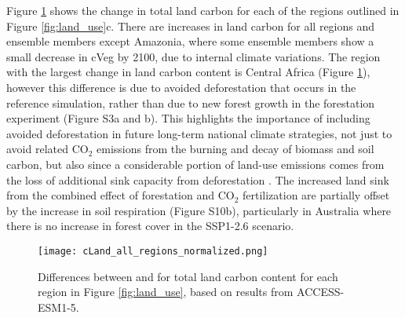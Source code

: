 \documentclass[draft]{agujournal2019}
\begin{document}
Figure \ref{fig:accesss_regional_cland} shows the change in total land carbon for each of the regions outlined in Figure \ref{fig:land_use}c.
There are increases in land carbon for all regions and ensemble members except Amazonia, where some ensemble members show a small decrease in cVeg by 2100, due to internal climate variations.
The region with the largest change in land carbon content is Central Africa (Figure \ref{fig:accesss_regional_cland}), however this difference is due to avoided deforestation that occurs in the reference simulation, rather than due to new forest growth in the forestation experiment (Figure S3a and b).
This highlights the importance of including avoided deforestation in future long-term national climate strategies, not just to avoid related CO$_2$ emissions from the burning and decay of biomass and soil carbon, but also since a considerable portion of land-use emissions comes from the loss of additional sink capacity from deforestation \cite{gitz_amplifying_2003, pongratz_terminology_2014, obermeier_modelled_2021}.
The increased land sink from the combined effect of forestation and CO$_2$ fertilization are partially offset by the increase in soil respiration (Figure S10b), particularly in Australia where there is no increase in forest cover in the SSP1-2.6 scenario.

\begin{figure}
    \texttt{[image: cLand\_all\_regions\_normalized.png]}
    \caption{Differences between  and  for  total land carbon content for each region in Figure \ref{fig:land_use}, based on results from ACCESS-ESM1-5.}
    \label{fig:accesss_regional_cland}
\end{figure}
\end{document}
